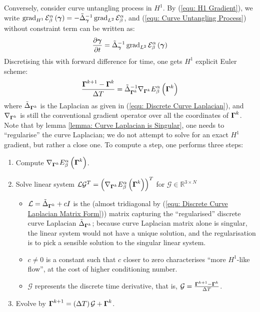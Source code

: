 \documentclass[../dissertation.tex]{subfiles}
\begin{document}
Conversely, consider curve untangling process in $H^1$.
By (\ref{equ: H1 Gradient}), we write $\operatorname{grad}_{H^1} \mathcal{E}_{\beta}^{\alpha} \left( \boldsymbol{\gamma} \right) = - \tilde{\Delta}_{\boldsymbol{\gamma}}^{-1} \operatorname{grad}_{L^2} \mathcal{E}_{\beta}^{\alpha}$,
and
(\ref{equ: Curve Untangling Process}) without constraint term can be written as:
\begin{equation}
    \frac{\partial \boldsymbol{\gamma}}{\partial t} = \tilde{\Delta}_{\boldsymbol{\gamma}}^{-1} \operatorname{grad}_{L^2} \mathcal{E}_{\beta}^{\alpha} \left( \boldsymbol{\gamma} \right)
\end{equation}
Discretising this with forward difference for time, one gets $H^1$ explicit Euler scheme:
\begin{equation}
    \frac{\boldsymbol{\Gamma}^{k+1} - \boldsymbol{\Gamma}^k}{\Delta T} = \tilde{\Delta}_{\boldsymbol{\Gamma}^k}^{-1} \nabla_{\boldsymbol{\Gamma}^k} E_{\beta}^{\alpha} \left( \boldsymbol{\Gamma}^k \right)
\end{equation}
where $\tilde{\Delta}_{\boldsymbol{\Gamma}^k}$ is the Laplacian as given in (\ref{equ: Discrete Curve Laplacian}),
and $\nabla_{\boldsymbol{\Gamma}^k}$ is still the conventional gradient operator over all the coordinates of $\boldsymbol{\Gamma}^k$.
Note that by lemma \ref{lemma: Curve Laplacian is Singular}, one needs to ``regularise'' the curve Laplacian;
we do not attempt to solve for an exact $H^1$ gradient, but rather a close one.
To compute a step, one performs three steps:
\begin{enumerate}
    \item Compute $\nabla_{\boldsymbol{\Gamma}^k} E_{\beta}^{\alpha} \left( \boldsymbol{\Gamma}^k \right)$.
    \item Solve linear system $\mathcal{L} \mathcal{G}^{T} = \left( \nabla_{\boldsymbol{\Gamma}^k} E_{\beta}^{\alpha} \left( \boldsymbol{\Gamma}^k \right) \right)^T$ for $\mathcal{G} \in \mathbb{R}^{3 \times N}$
        \begin{itemize}
            \item $\mathcal{L} = \tilde{\Delta}_{\boldsymbol{\Gamma}^k} + cI$ is the (almost tridiagonal by (\ref{equ: Discrete Curve Laplacian Matrix Form})) matrix capturing the ``regularised'' discrete curve Laplacian $\tilde{\Delta}_{\boldsymbol{\Gamma}^k}$;
                because curve Laplacian matrix alone is singular, the linear system would not have a unique solution,
                and the regularisation is to pick a sensible solution to the singular linear system.
            \item $c \neq 0$ is a constant such that $c$ closer to zero characterises ``more $H^1$-like flow'', at the cost of higher conditioning number.
            \item $\mathcal{G}$ represents the discrete time derivative, that is, $\mathcal{G} = \frac{\boldsymbol{\Gamma}^{k+1} - \boldsymbol{\Gamma}^k}{\Delta T}$.
        \end{itemize}
    \item Evolve by $\boldsymbol{\Gamma}^{k+1} = \left( \Delta T \right) \mathcal{G} + \boldsymbol{\Gamma}^k$.
\end{enumerate}
\end{document}
